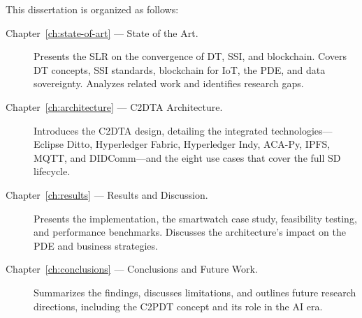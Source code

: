 \noindent This dissertation is organized as follows:

\begin{description}
    \item[Chapter~\ref{ch:state-of-art} --- State of the Art.] Presents the \ac{SLR} on the convergence of \ac{DT}, \ac{SSI}, and blockchain. Covers \ac{DT} concepts, \ac{SSI} standards, blockchain for \ac{IoT}, the \ac{PDE}, and data sovereignty. Analyzes related work and identifies research gaps.

    \item[Chapter~\ref{ch:architecture} --- \ac{C2DTA} Architecture.] Introduces the \ac{C2DTA} design, detailing the integrated technologies---Eclipse Ditto, Hyperledger Fabric, Hyperledger Indy, ACA-Py, \ac{IPFS}, \ac{MQTT}, and \ac{DIDComm}---and the eight use cases that cover the full \ac{SD} lifecycle.

    \item[Chapter~\ref{ch:results} --- Results and Discussion.] Presents the implementation, the smartwatch case study, feasibility testing, and performance benchmarks. Discusses the architecture's impact on the \ac{PDE} and business strategies.

    \item[Chapter~\ref{ch:conclusions} --- Conclusions and Future Work.] Summarizes the findings, discusses limitations, and outlines future research directions, including the \ac{C2PDT} concept and its role in the \ac{AI} era.
\end{description}
